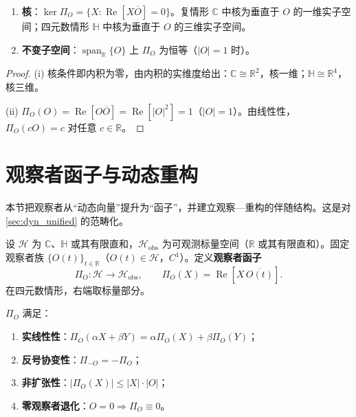 \begin{property}[统一投影的核与不变量]\label{prop:dyn_unified_kernel}
\begin{enumerate}[label=(\roman*)]
    \item \textbf{核}：$\ker\Pi_O=\{X:\operatorname{Re}[X\overline O]=0\}$。复情形 $\mathbb C$ 中核为垂直于 $O$ 的一维实子空间；四元数情形 $\mathbb H$ 中核为垂直于 $O$ 的三维实子空间。
    \item \textbf{不变子空间}：$\operatorname{span}_{\mathbb R}\{O\}$ 上 $\Pi_O$ 为恒等（$|O|=1$ 时）。
\end{enumerate}
\end{property}

\begin{proof}
(i) 核条件即内积为零，由内积的实维度给出：$\mathbb C\cong\mathbb R^2$，核一维；$\mathbb H\cong\mathbb R^4$，核三维。

(ii) $\Pi_O(O)=\operatorname{Re}[O\overline O]=\operatorname{Re}[|O|^2]=1$（$|O|=1$）。由线性性，$\Pi_O(cO)=c$ 对任意 $c\in\mathbb R$。
\end{proof}

\section{观察者函子与动态重构}
\label{sec:dyn_observer_functor}

本节把观察者从“动态向量”提升为“函子”，并建立观察—重构的伴随结构。这是对 \cref{sec:dyn_unified} 的范畴化。

\begin{definition}[观察者函子]\label{def:dyn_observer_functor}
设 $\mathcal H$ 为 $\mathbb C$、$\mathbb H$ 或其有限直和，$\mathcal H_{\text{obs}}$ 为可观测标量空间（$\mathbb R$ 或其有限直和）。固定观察者族 $\{O(t)\}_{t\in\mathbb R}$（$O(t)\in\mathcal H$，$C^1$）。定义\textbf{观察者函子}
\[
\Pi_O:\mathcal H\longrightarrow\mathcal H_{\text{obs}},\qquad
\Pi_O(X)=\operatorname{Re}[X\,\overline{O(t)}].
\]
在四元数情形，右端取标量部分。
\end{definition}

\begin{proposition}[观察者函子的基本性质]\label{prop:dyn_observer_functor_basic}
$\Pi_O$ 满足：
\begin{enumerate}[label=(\roman*)]
    \item \textbf{实线性性}：$\Pi_O(\alpha X+\beta Y)=\alpha\Pi_O(X)+\beta\Pi_O(Y)$；
    \item \textbf{反号协变性}：$\Pi_{-O}=-\Pi_O$；
    \item \textbf{非扩张性}：$|\Pi_O(X)|\le|X|\cdot|O|$；
    \item \textbf{零观察者退化}：$O=0\Rightarrow\Pi_O\equiv 0$。
\end{enumerate}
\end{proposition}

